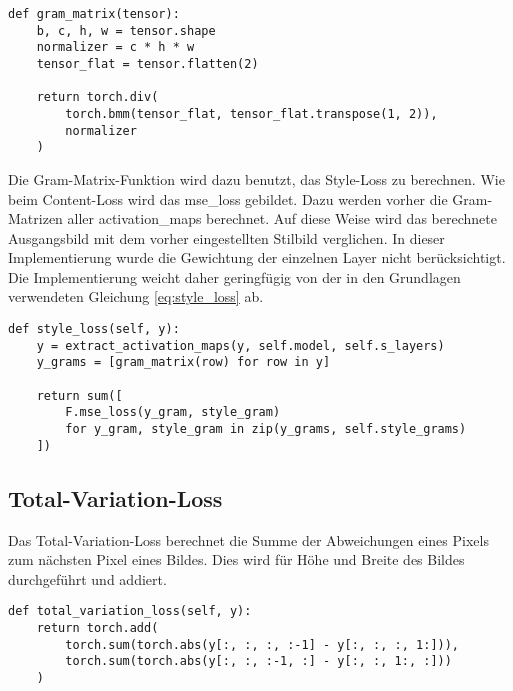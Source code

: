 \begin{listing}[H]
\begin{verbatim}
def gram_matrix(tensor):
    b, c, h, w = tensor.shape
    normalizer = c * h * w
    tensor_flat = tensor.flatten(2)

    return torch.div(
        torch.bmm(tensor_flat, tensor_flat.transpose(1, 2)),
        normalizer
    )
\end{verbatim}
\end{listing}

Die Gram-Matrix-Funktion wird dazu benutzt, das Style-Loss zu berechnen. Wie beim Content-Loss wird das \gls{mse_loss} gebildet. Dazu werden vorher die Gram-Matrizen aller \gls{activation_map}s berechnet. Auf diese Weise wird das berechnete Ausgangsbild mit dem vorher eingestellten Stilbild verglichen. In dieser Implementierung wurde die Gewichtung der einzelnen Layer nicht berücksichtigt. Die Implementierung weicht daher geringfügig von der in den Grundlagen verwendeten Gleichung \eqref{eq:style_loss} ab.

\begin{listing}[H]
\begin{verbatim}
def style_loss(self, y):
    y = extract_activation_maps(y, self.model, self.s_layers)
    y_grams = [gram_matrix(row) for row in y]

    return sum([
        F.mse_loss(y_gram, style_gram)
        for y_gram, style_gram in zip(y_grams, self.style_grams)
    ])
\end{verbatim}
\end{listing}

\pagebreak

\subsection{Total-Variation-Loss}

Das Total-Variation-Loss berechnet die Summe der Abweichungen eines Pixels zum nächsten Pixel eines Bildes. Dies wird für Höhe und Breite des Bildes durchgeführt und addiert.

\begin{listing}[H]
\begin{verbatim}
def total_variation_loss(self, y):
    return torch.add(
        torch.sum(torch.abs(y[:, :, :, :-1] - y[:, :, :, 1:])),
        torch.sum(torch.abs(y[:, :, :-1, :] - y[:, :, 1:, :]))
    )
\end{verbatim}
\end{listing}

